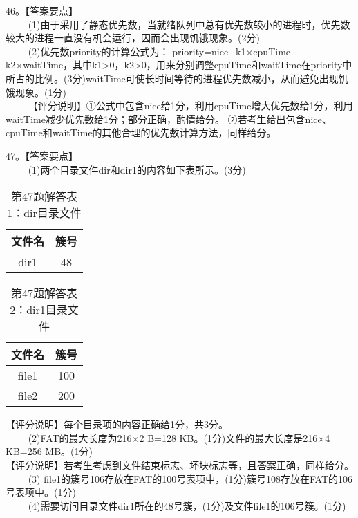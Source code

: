 46。【答案要点】 \\
$\qquad$ (1)由于采用了静态优先数，当就绪队列中总有优先数较小的进程时，优先数较大的进程一直没有机会运行，因而会出现饥饿现象。(2分) \\
$\qquad$ (2)优先数priority的计算公式为：
priority=nice+k1×cpuTime-k2×waitTime，其中k1>0，k2>0，用来分别调整cpuTime和waitTime在priority中所占的比例。(3分)waitTime可使长时间等待的进程优先数减小，从而避免出现饥饿现象。(1分) \\
$\qquad$ 【评分说明】①公式中包含nice给1分，利用cpuTime增大优先数给1分，利用waitTime减少优先数给1分；部分正确，酌情给分。
②若考生给出包含nice、cpuTime和waitTime的其他合理的优先数计算方法，同样给分。

47。【答案要点】 \\
$\qquad$ (1)两个目录文件dir和dir1的内容如下表所示。(3分)
\begin{table}[ht]
\centering
\caption{第47题解答表1：dir目录文件}\label{tab_CSN16_6}
\begin{tabular}{|c|c|}
\hline
文件名 & 簇号 \\
\hline
dir1 & 48 \\
\hline
\end{tabular}
\end{table}

\begin{table}[ht]
\centering
\caption{第47题解答表2：dir1目录文件}\label{tab_CSN16_7}
\begin{tabular}{|c|c|}
\hline
文件名 & 簇号 \\
\hline
file1 & 100 \\
\hline
file2 & 200 \\
\hline
\end{tabular}
\end{table}
【评分说明】每个目录项的内容正确给1分，共3分。 \\
$\qquad$ (2)FAT的最大长度为216×2 B=128 KB。(1分)文件的最大长度是216×4 KB=256 MB。(1分) \\
【评分说明】若考生考虑到文件结束标志、坏块标志等，且答案正确，同样给分。 \\
$\qquad$ (3) file1的簇号106存放在FAT的100号表项中，(1分)簇号108存放在FAT的106号表项中。(1分) \\
$\qquad$ (4)需要访问目录文件dir1所在的48号簇，(1分)及文件file1的106号簇。(1分)